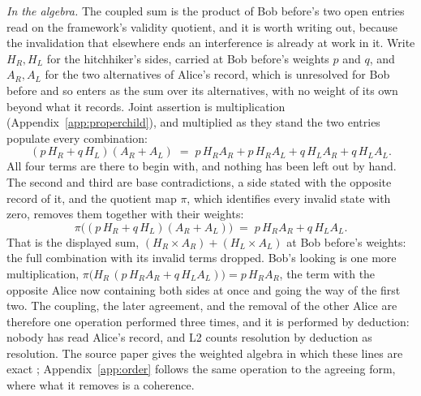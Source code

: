 \textit{In the algebra.} The coupled sum is the product of Bob before's two open entries read on the framework's validity quotient, and it is worth writing out, because the invalidation that elsewhere ends an interference is already at work in it. Write $H_R, H_L$ for the hitchhiker's sides, carried at Bob before's weights $p$ and $q$, and $A_R, A_L$ for the two alternatives of Alice's record, which is unresolved for Bob before and so enters as the sum over its alternatives, with no weight of its own beyond what it records. Joint assertion is multiplication (Appendix~\ref{app:properchild}), and multiplied as they stand the two entries populate every combination:
\[
(p\,H_R + q\,H_L)(A_R + A_L) \;=\; p\,H_R A_R + p\,H_R A_L + q\,H_L A_R + q\,H_L A_L .
\]
All four terms are there to begin with, and nothing has been left out by hand. The second and third are base contradictions, a side stated with the opposite record of it, and the quotient map $\pi$, which identifies every invalid state with zero, removes them together with their weights:
\[
\pi\big((p\,H_R + q\,H_L)(A_R + A_L)\big) \;=\; p\,H_R A_R + q\,H_L A_L .
\]
That is the displayed sum, $(H_R \times A_R) + (H_L \times A_L)$ at Bob before's weights: the full combination with its invalid terms dropped. Bob's looking is one more multiplication, $\pi\big(H_R\,(p\,H_R A_R + q\,H_L A_L)\big) = p\,H_R A_R$, the term with the opposite Alice now containing both sides at once and going the way of the first two. The coupling, the later agreement, and the removal of the other Alice are therefore one operation performed three times, and it is performed by deduction: nobody has read Alice's record, and L2 counts resolution by deduction as resolution. The source paper gives the weighted algebra in which these lines are exact \cite{Aethus}; Appendix~\ref{app:order} follows the same operation to the agreeing form, where what it removes is a coherence.

